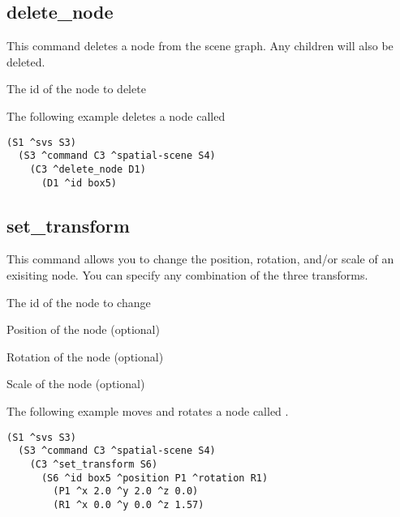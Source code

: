\subsection{delete\_node}

This command deletes a node from the scene graph. Any children will also be deleted.

\begin{description}
	\item{} The id of the node to delete
\end{description}

The following example deletes a node called 

\begin{verbatim}
(S1 ^svs S3)
  (S3 ^command C3 ^spatial-scene S4)
    (C3 ^delete_node D1)
      (D1 ^id box5)
\end{verbatim}


\subsection{set\_transform}

This command allows you to change the position, rotation, and/or scale of an
exisiting node. You can specify any combination of the three transforms.

\begin{description}
	\item{} The id of the node to change
	\item{} Position of the node (optional)
	\item{} Rotation of the node (optional)
	\item{} Scale of the node (optional)
\end{description}

The following example moves and rotates a node called .

\begin{verbatim}
(S1 ^svs S3)
  (S3 ^command C3 ^spatial-scene S4)
    (C3 ^set_transform S6)
      (S6 ^id box5 ^position P1 ^rotation R1)
        (P1 ^x 2.0 ^y 2.0 ^z 0.0)
        (R1 ^x 0.0 ^y 0.0 ^z 1.57)
\end{verbatim}


